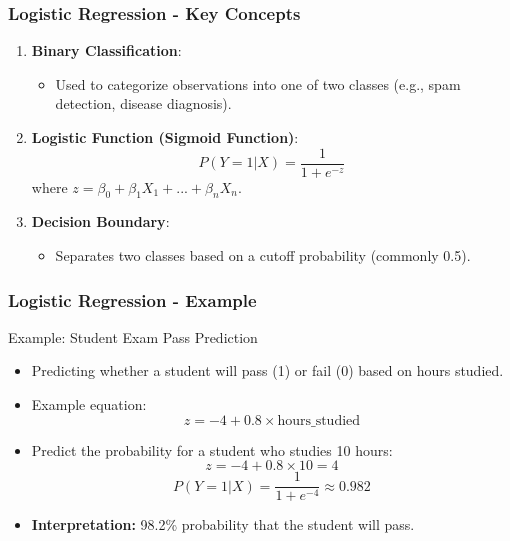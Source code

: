 \documentclass[aspectratio=169]{beamer}
\begin{document}
\begin{frame}[fragile]
    \frametitle{Logistic Regression - Key Concepts}
    \begin{enumerate}
        \item \textbf{Binary Classification}:
        \begin{itemize}
            \item Used to categorize observations into one of two classes (e.g., spam detection, disease diagnosis).
        \end{itemize}
        \item \textbf{Logistic Function (Sigmoid Function)}:
        \begin{equation}
            P(Y=1 | X) = \frac{1}{1 + e^{-z}}
        \end{equation}
        where \( z = \beta_0 + \beta_1 X_1 + ... + \beta_n X_n \).
        \item \textbf{Decision Boundary}:
        \begin{itemize}
            \item Separates two classes based on a cutoff probability (commonly 0.5).
        \end{itemize}
    \end{enumerate}
\end{frame}

\begin{frame}[fragile]
    \frametitle{Logistic Regression - Example}
    \begin{block}{Example: Student Exam Pass Prediction}
        \begin{itemize}
            \item Predicting whether a student will pass (1) or fail (0) based on hours studied.
            \item Example equation: 
            \begin{equation}
                z = -4 + 0.8 \times \text{hours\_studied}
            \end{equation}
            \item Predict the probability for a student who studies 10 hours:
            \begin{equation}
                z = -4 + 0.8 \times 10 = 4
            \end{equation}
            \begin{equation}
                P(Y=1 | X) = \frac{1}{1 + e^{-4}} \approx 0.982
            \end{equation}
            \item \textbf{Interpretation:} 98.2\% probability that the student will pass.
        \end{itemize}
    \end{block}
\end{frame}
\end{document}
